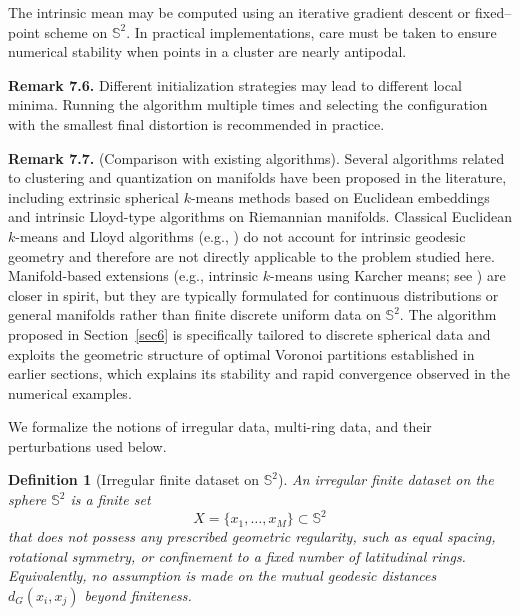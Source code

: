 \documentclass[12pt, reqno]{amsart}
\theoremstyle{plain}
\newtheorem{defi}[subsection]{Definition}
\theoremstyle{definition}
\newcommand{\D}[1]{\mathbb{#1}}%
\begin{document}
\medskip

The intrinsic mean may be computed using an iterative gradient descent or fixed--point scheme on $\D S^2$. In practical
implementations, care must be taken to ensure numerical stability when points in a cluster are nearly antipodal.

\medskip

\noindent\textbf{Remark 7.6.}
Different initialization strategies may lead to different local minima. Running the algorithm multiple times and
selecting the configuration with the smallest final distortion is recommended in practice.

 \medskip

\noindent\textbf{Remark 7.7.} (Comparison with existing algorithms).
Several algorithms related to clustering and quantization on manifolds have been proposed in the
literature, including extrinsic spherical $k$-means methods based on Euclidean embeddings and
intrinsic Lloyd-type algorithms on Riemannian manifolds.
Classical Euclidean $k$-means and Lloyd algorithms (e.g., \cite{Pollard1982,GrafLuschgy2000})
do not account for intrinsic geodesic geometry and therefore are not directly applicable to the
problem studied here.
Manifold-based extensions (e.g., intrinsic $k$-means using Karcher means; see \cite{Karcher1977,Afsari2011})
are closer in spirit, but they are typically formulated for continuous distributions or general
manifolds rather than finite discrete uniform data on $\D S^2$.
The algorithm proposed in Section~\ref{sec6} is specifically tailored to discrete spherical data and exploits
the geometric structure of optimal Voronoi partitions established in earlier sections, which explains
its stability and rapid convergence observed in the numerical examples.

We formalize the notions of irregular data, multi-ring data, and their perturbations used below.

\begin{defi}[Irregular finite dataset on $\D S^2$]
An \emph{irregular finite dataset} on the sphere $\D S^2$ is a finite set
\[
X=\{x_1,\dots,x_M\}\subset \D S^2
\]
that does not possess any prescribed geometric regularity, such as equal spacing,
rotational symmetry, or confinement to a fixed number of latitudinal rings.
Equivalently, no assumption is made on the mutual geodesic distances
$d_G(x_i,x_j)$ beyond finiteness.
\end{defi} 
\end{document}
